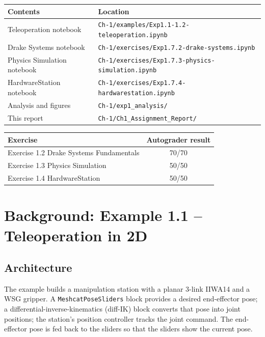 \documentclass[11pt]{article}
\begin{document}
\begin{center}
\begin{tabular}{ll}
\toprule
Contents & Location \\
\midrule
Teleoperation notebook & \texttt{Ch-1/examples/Exp1.1-1.2-teleoperation.ipynb} \\
Drake Systems notebook & \texttt{Ch-1/exercises/Exp1.7.2-drake-systems.ipynb} \\
Physics Simulation notebook & \texttt{Ch-1/exercises/Exp1.7.3-physics-simulation.ipynb} \\
HardwareStation notebook & \texttt{Ch-1/exercises/Exp1.7.4-hardwarestation.ipynb} \\
Analysis and figures & \texttt{Ch-1/exp1\_analysis/} \\
This report & \texttt{Ch-1/Ch1\_Assignment\_Report/} \\
\bottomrule
\end{tabular}
\end{center}

\begin{center}
\begin{tabular}{lc}
\toprule
Exercise & Autograder result \\
\midrule
Exercise 1.2 Drake Systems Fundamentals & 70/70 \\
Exercise 1.3 Physics Simulation & 50/50 \\
Exercise 1.4 HardwareStation & 50/50 \\
\bottomrule
\end{tabular}
\end{center}

\section{Background: Example 1.1 -- Teleoperation in 2D}

\subsection{Architecture}

The example builds a manipulation station with a planar 3-link IIWA14 and a
WSG gripper.  A \texttt{MeshcatPoseSliders} block provides a desired
end-effector pose; a differential-inverse-kinematics (diff-IK) block converts
that pose into joint positions; the station's position controller tracks the
joint command.  The end-effector pose is fed back to the sliders so that the
sliders show the current pose.
\end{document}

